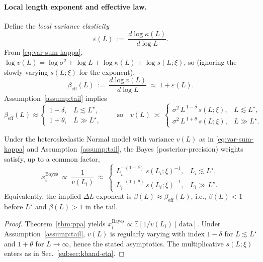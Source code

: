 \paragraph{Local length exponent and effective law.}
Define the \emph{local variance elasticity}
\[
\varepsilon(L)\ :=\ \frac{d\log \kappa(L)}{d\log L}.
\]
From \eqref{eq:var-sum-kappa},
\(
\log v(L)=\log\sigma^2+\log L+\log\kappa(L)+\log s(L;\xi)
\),
so (ignoring the slowly varying $s(L;\xi)$ for the exponent),
\begin{equation}
  \beta_{\mathrm{eff}}(L)
  \ :=\ \frac{d\log v(L)}{d\log L}\ \approx\ 1+\varepsilon(L).
  \label{eq:beta-local}
\end{equation}
Assumption~\ref{assump:tail} implies
\[
\beta_{\mathrm{eff}}(L)\approx
\begin{cases}
1-\delta, & L\lesssim L^\star,\\
1+\theta, & L\gg L^\star,
\end{cases}
\qquad
\text{so}\quad
v(L)\ \asymp\
\begin{cases}
\sigma^2\,L^{\,1-\delta}\,s(L;\xi), & L\lesssim L^\star,\\
\sigma^2\,L^{\,1+\theta}\,s(L;\xi), & L\gg L^\star.
\end{cases}
\label{eq:effective-length-piecewise}
\]

\begin{proposition}\label{prop:tail-weights}
Under the heteroskedastic Normal model with variance $v(L)$ as in \eqref{eq:var-sum-kappa} and Assumption~\ref{assump:tail}, the Bayes (posterior-precision) weights satisfy, up to a common factor,
\begin{equation}
x_i^{\mathrm{Bayes}}
\ \propto\
\frac{1}{v(L_i)}
\ \approx\
\begin{cases}
L_i^{-(1-\delta)}\,s(L_i;\xi)^{-1}, & L_i\lesssim L^\star,\\[2pt]
L_i^{-(1+\theta)}\,s(L_i;\xi)^{-1}, & L_i\gg L^\star.
\end{cases}
\label{eq:weights-piecewise}
\end{equation}
Equivalently, the implied $\Delta L$ exponent is \(\beta(L)\approx\beta_{\mathrm{eff}}(L)\), i.e., $\beta(L)<1$ before $L^\star$ and $\beta(L)>1$ in the tail.
\end{proposition}

\begin{proof}
Theorem~\ref{thm:ppa} yields $x_i^{\mathrm{Bayes}}\propto\mathbb{E}[1/v(L_i)\mid\text{data}]$. Under Assumption~\ref{assump:tail}, $v(L)$ is regularly varying with index $1-\delta$ for $L\lesssim L^\star$ and $1+\theta$ for $L\to\infty$, hence the stated asymptotics. The multiplicative $s(L;\xi)$ enters as in Sec.~\ref{subsec:kband-eta}.
\end{proof}

